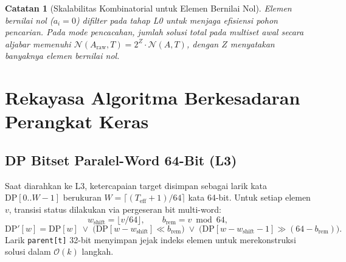 \documentclass[journal,onecolumn,11pt]{IEEEtran}
\newtheorem{remark}{Catatan}
\begin{document}
\begin{remark}[Skalabilitas Kombinatorial untuk Elemen Bernilai Nol]
\label{rem:zero-count}
Elemen bernilai nol ($a_i = 0$) difilter pada tahap L0 untuk menjaga efisiensi pohon pencarian. Pada mode pencacahan, jumlah solusi total pada multiset awal secara aljabar memenuhi $\mathcal{N}(A_{\text{raw}}, T) = 2^Z \cdot \mathcal{N}(A, T)$, dengan $Z$ menyatakan banyaknya elemen bernilai nol.
\end{remark}

\section{Rekayasa Algoritma Berkesadaran Perangkat Keras}
\label{sec:hardware_engineering}

\subsection{DP Bitset Paralel-Word 64-Bit (L3)}
Saat diarahkan ke L3, ketercapaian target disimpan sebagai larik kata $\text{DP}[0..W{-}1]$ berukuran $W=\lceil (T_{\text{eff}}+1)/64\rceil$ kata 64-bit. Untuk setiap elemen $v$, transisi status dilakukan via pergeseran bit multi-word:
\begin{equation}
    w_{\text{shift}} = \lfloor v/64\rfloor, \qquad b_{\text{rem}} = v \bmod 64,
\end{equation}
\begin{equation}
    \text{DP}'[w] = \text{DP}[w] \;\lor\; \big(\text{DP}[w-w_{\text{shift}}] \ll b_{\text{rem}}\big) \;\lor\; \big(\text{DP}[w-w_{\text{shift}}-1] \gg (64-b_{\text{rem}})\big).
    \label{eq:bitset_transition}
\end{equation}
Larik \texttt{parent[t]} 32-bit menyimpan jejak indeks elemen untuk merekonstruksi solusi dalam $\mathcal{O}(k)$ langkah.
\end{document}
